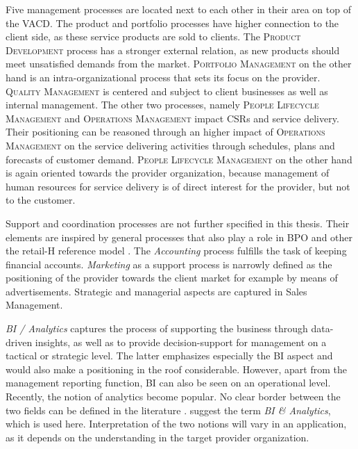 	 Five management processes are located next to each other in their area on top of the \acrshort{VACD}. The product and portfolio processes have higher connection to the client side, as these service products are sold to clients. The \textsc{Product Development} process has a stronger external relation, as new products should meet unsatisfied demands from the market. \textsc{Portfolio Management} on the other hand is an intra-organizational process that sets its focus on the provider. \textsc{Quality Management} is centered and subject to client businesses as well as internal management. The other two processes, namely \textsc{People Lifecycle Management} and \textsc{Operations Management} impact \acrshort{CSR}s and service delivery. Their positioning can be reasoned through an higher impact of \textsc{Operations Management} on the service delivering activities through schedules, plans and forecasts of customer demand. \textsc{People Lifecycle Management} on the other hand is again oriented towards the provider organization, because management of human resources for service delivery is of direct interest for the provider, but not to the customer.
	 
	 Support and coordination processes are not further specified in this thesis. Their elements are inspired by general processes that also play a role in \acrshort{BPO} and other the retail-H reference model \cite{becker2004handelsinformationssysteme}. The \textit{Accounting} process fulfills the task of keeping financial accounts. \textit{Marketing} as a support process is narrowly defined as the positioning of the provider towards the client market for example by means of advertisements. Strategic and managerial aspects are captured in Sales Management. 
	 
	 \textit{ \acrfull{BI} / Analytics} captures the process of supporting the business through data-driven insights, as well as to provide decision-support for management on a tactical or strategic level. The latter emphasizes especially the \acrshort{BI} aspect and would also make a positioning in the roof considerable. However, apart from the management reporting function, \acrshort{BI} can also be seen on an operational level. Recently, the notion of analytics become popular. No clear border between the two fields can be defined in the literature \citep{mertens}. \cite{Chen:2012:BIA} suggest the term \textit{\acrshort{BI} \& Analytics}, which is used here. Interpretation of the two notions will vary in an application, as it depends on the understanding in the target provider organization. 
	  
